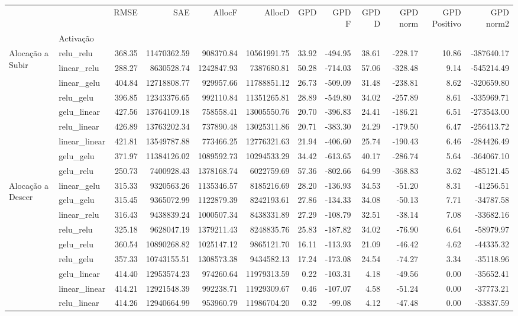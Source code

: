 \begin{tabular}{llrrrrrrrrrr}
\toprule
 &  & RMSE & SAE & AllocF & AllocD & GPD & GPD F & GPD D & GPD norm & GPD Positivo & GPD norm2 \\
 & Activação &  &  &  &  &  &  &  &  &  &  \\
\midrule
\multirow[t]{9}{*}{Alocação a Subir} & relu_relu & 368.35 & 11470362.59 & 908370.84 & 10561991.75 & 33.92 & -494.95 & 38.61 & -228.17 & 10.86 & -387640.17 \\
 & linear_relu & 288.27 & 8630528.74 & 1242847.93 & 7387680.81 & 50.28 & -714.03 & 57.06 & -328.48 & 9.14 & -545214.49 \\
 & linear_gelu & 404.84 & 12718808.77 & 929957.66 & 11788851.12 & 26.73 & -509.09 & 31.48 & -238.81 & 8.62 & -320659.80 \\
 & relu_gelu & 396.85 & 12343376.65 & 992110.84 & 11351265.81 & 28.89 & -549.80 & 34.02 & -257.89 & 8.61 & -335969.71 \\
 & gelu_linear & 427.56 & 13764109.18 & 758558.41 & 13005550.76 & 20.70 & -396.83 & 24.41 & -186.21 & 6.51 & -273543.00 \\
 & relu_linear & 426.89 & 13763202.34 & 737890.48 & 13025311.86 & 20.71 & -383.30 & 24.29 & -179.50 & 6.47 & -256413.72 \\
 & linear_linear & 421.81 & 13549787.88 & 773466.25 & 12776321.63 & 21.94 & -406.60 & 25.74 & -190.43 & 6.46 & -284426.49 \\
 & gelu_gelu & 371.97 & 11384126.02 & 1089592.73 & 10294533.29 & 34.42 & -613.65 & 40.17 & -286.74 & 5.64 & -364067.10 \\
 & gelu_relu & 250.73 & 7400928.43 & 1378168.74 & 6022759.69 & 57.36 & -802.66 & 64.99 & -368.83 & 3.62 & -485121.45 \\
\cline{1-12}
\multirow[t]{9}{*}{Alocação a Descer} & linear_gelu & 315.33 & 9320563.26 & 1135346.57 & 8185216.69 & 28.20 & -136.93 & 34.53 & -51.20 & 8.31 & -41256.51 \\
 & gelu_gelu & 315.45 & 9365072.99 & 1122879.39 & 8242193.61 & 27.86 & -134.33 & 34.08 & -50.13 & 7.71 & -34787.58 \\
 & linear_relu & 316.43 & 9438839.24 & 1000507.34 & 8438331.89 & 27.29 & -108.79 & 32.51 & -38.14 & 7.08 & -33682.16 \\
 & relu_relu & 325.18 & 9628047.19 & 1379211.43 & 8248835.76 & 25.83 & -187.82 & 34.02 & -76.90 & 6.64 & -58979.97 \\
 & gelu_relu & 360.54 & 10890268.82 & 1025147.12 & 9865121.70 & 16.11 & -113.93 & 21.09 & -46.42 & 4.62 & -44335.32 \\
 & relu_gelu & 357.33 & 10743155.51 & 1308573.38 & 9434582.13 & 17.24 & -173.08 & 24.54 & -74.27 & 3.34 & -35118.96 \\
 & gelu_linear & 414.40 & 12953574.23 & 974260.64 & 11979313.59 & 0.22 & -103.31 & 4.18 & -49.56 & 0.00 & -35652.41 \\
 & linear_linear & 414.21 & 12921548.39 & 992238.71 & 11929309.67 & 0.46 & -107.07 & 4.58 & -51.24 & 0.00 & -37773.21 \\
 & relu_linear & 414.26 & 12940664.99 & 953960.79 & 11986704.20 & 0.32 & -99.08 & 4.12 & -47.48 & 0.00 & -33837.59 \\
\cline{1-12}
\bottomrule
\end{tabular}
